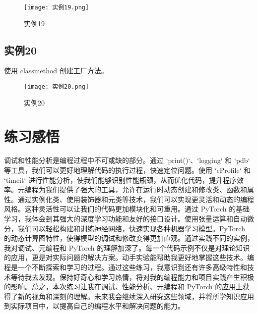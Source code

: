 \documentclass[a4paper, 12pt]{article}
\begin{document}
\begin{figure}[h!]
  \centering
  \texttt{[image: 实例19.png]}
  \caption{实例19}
\end{figure}


\subsection{实例20}
使用 classmethod 创建工厂方法。

\begin{figure}[h!]
  \centering
  \texttt{[image: 实例20.png]}
  \caption{实例20}
\end{figure}

\section{练习感悟}
调试和性能分析是编程过程中不可或缺的部分。通过 `print()`、`logging` 和 `pdb` 等工具，我们可以更好地理解代码的执行过程，快速定位问题。使用 `cProfile` 和 `timeit` 进行性能分析，使我们能够识别性能瓶颈，从而优化代码，提升程序效率。元编程为我们提供了强大的工具，允许在运行时动态创建和修改类、函数和属性。通过实例化类、使用装饰器和元类等技术，我们可以实现更灵活和动态的编程风格。这种灵活性可以让我们的代码更加模块化和可重用。通过 PyTorch 的基础学习，我体会到其强大的深度学习功能和友好的接口设计。使用张量运算和自动微分，我们可以轻松构建和训练神经网络，快速实现各种机器学习模型。PyTorch 的动态计算图特性，使得模型的调试和修改变得更加直观。通过实践不同的实例，我对调试、元编程和 PyTorch 的理解加深了。每一个代码示例不仅是对理论知识的应用，更是对实际问题的解决方案。动手实验能帮助我更好地掌握这些技术。编程是一个不断探索和学习的过程。通过这些练习，我意识到还有许多高级特性和技术等待我去发现。保持好奇心和学习热情，将对我的编程能力和项目实践产生积极的影响。总之，本次练习让我在调试、性能分析、元编程和 PyTorch 的应用上获得了新的视角和深刻的理解。未来我会继续深入研究这些领域，并将所学知识应用到实际项目中，以提高自己的编程水平和解决问题的能力。
\end{document}
